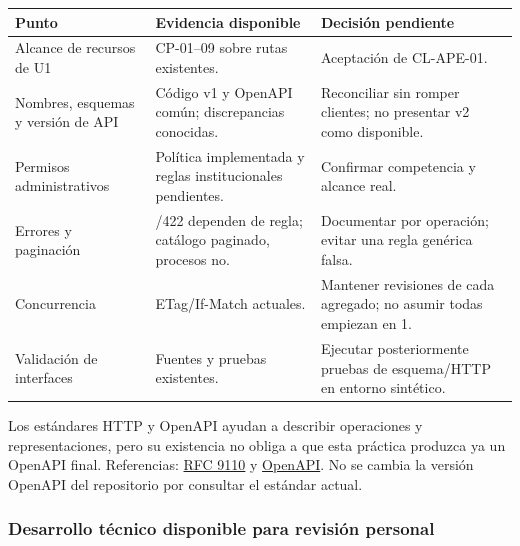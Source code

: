 \documentclass[11pt,a4paper]{article}
\begin{document}
{\def\LTcaptype{none} %
\begin{longtable}[]{@{}
  >{\raggedright\arraybackslash}p{}
  >{\raggedright\arraybackslash}p{}
  >{\raggedright\arraybackslash}p{}@{}}
\toprule\noalign{}
\begin{minipage}[b]{\linewidth}\raggedright
Punto
\end{minipage} & \begin{minipage}[b]{\linewidth}\raggedright
Evidencia disponible
\end{minipage} & \begin{minipage}[b]{\linewidth}\raggedright
Decisión pendiente
\end{minipage} \\
\midrule\noalign{}
\endhead
\bottomrule\noalign{}
\endlastfoot
Alcance de recursos de U1 & CP-01--09 sobre rutas existentes. &
Aceptación de CL-APE-01. \\
Nombres, esquemas y versión de API & Código v1 y OpenAPI común;
discrepancias conocidas. & Reconciliar sin romper clientes; no presentar
v2 como disponible. \\
Permisos administrativos & Política implementada y reglas
institucionales pendientes. & Confirmar competencia y alcance real. \\
Errores y paginación & 400/422 dependen de regla; catálogo paginado,
procesos no. & Documentar por operación; evitar una regla genérica
falsa. \\
Concurrencia & ETag/If-Match actuales. & Mantener revisiones de cada
agregado; no asumir todas empiezan en 1. \\
Validación de interfaces & Fuentes y pruebas existentes. & Ejecutar
posteriormente pruebas de esquema/HTTP en entorno sintético. \\
\end{longtable}
}

Los estándares HTTP y OpenAPI ayudan a describir operaciones y
representaciones, pero su existencia no obliga a que esta práctica
produzca ya un OpenAPI final. Referencias:
\href{https://www.rfc-editor.org/rfc/rfc9110.html}{RFC 9110} y
\href{https://spec.openapis.org/oas/latest.html}{OpenAPI}. No se cambia
la versión OpenAPI del repositorio por consultar el estándar actual.

\subsubsection{Desarrollo técnico disponible para revisión
personal}\label{desarrollo-tuxe9cnico-disponible-para-revisiuxf3n-personal}
\end{document}
